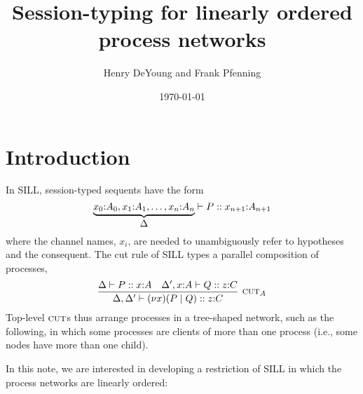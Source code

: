 \documentclass{article}
\title{Session-typing for linearly ordered process networks}
\author{Henry DeYoung and Frank Pfenning}
\date{\today}
\begin{document}
\maketitle

\section{Introduction}\label{sec:introduction}

In \ac{SILL}, session-typed sequents have the form
\begin{equation*}
  \underbrace{
    x_0{:}A_0 , x_1{:}A_1 , \dots , x_n{:}A_n
  }_{\textstyle \Delta}
  \vdash
  P :: x_{n+1}{:}A_{n+1}
\end{equation*}
where the channel names, $x_i$, are needed to unambiguously refer to hypotheses and the consequent.
The cut rule of \ac{SILL} types a parallel composition of processes,
\begin{equation*}
  \infer[\cut{A}]{\lctx , \lctx' \vdash (\nu x)(P \mid Q) :: z{:}C}{
    \lctx \vdash P :: x{:}A &
    \lctx' , x{:}A \vdash Q :: z{:}C}
\end{equation*}
Top-level $\cut{}$s thus arrange processes in a tree-shaped network, such as the following, in which some processes are clients of more than one process (i.e., some nodes have more than one child).
\begin{center}
\end{center}
In this note, we are interested in developing a restriction of \ac{SILL} in which the process networks are linearly ordered:
\begin{center}
\end{center}
\end{document}
